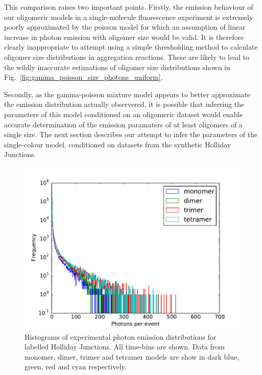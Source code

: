 This comparison raises two important points. Firstly, the emission behaviour of our oligomeric models in a single-molecule fluorescence experiment is extremely poorly approximated by the poisson model for which an assumption of linear increase in photon emission with oligomer size would be valid. It is therefore clearly inappropriate to attempt using a simple thresholding method to calculate oligomer size distributions in aggregation reactions. These are likely to lead to the wildly inaccurate estimations of oligomer size distributions shown in Fig.~\ref{fig:gamma_poisson_size_photons_uniform}.

Secondly, as the gamma-poisson mixture model appears to better approximate the emission distribution actually observered, it is possible that inferring the parameters of this model conditioned on an oligomeric dataset would enable accurate determination of the emission paramaters of at least oligomers of a single size. The next section describes our attempt to infer the parameters of the single-colour model, conditioned on datasets from the synthetic Holliday Junctions.  

\begin{figure}
   \begin{center}
      \includegraphics*[clip=true, width=6in]{sizing/Holliday_Junctions.pdf}
      \caption{Histograms of experimental photon emission distributions for labelled Holliday Junctions. All time-bins are shown. Data from monomer, dimer, trimer and tetramer models are show in dark blue, green, red and cyan respectively.}
      \label{fig:HJ_oligomers}
   \end{center}
\end{figure}

